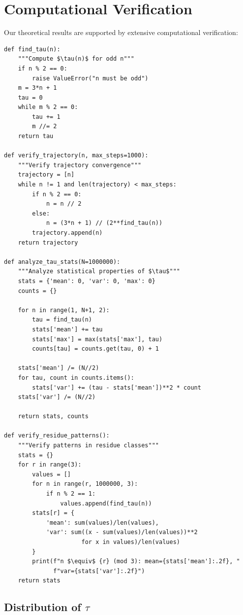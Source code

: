 \section{Computational Verification}\label{sec:computational}

Our theoretical results are supported by extensive computational verification:

\begin{lstlisting}[caption=Core Verification Functions]
def find_tau(n):
    """Compute $\tau(n)$ for odd n"""
    if n % 2 == 0:
        raise ValueError("n must be odd")
    m = 3*n + 1
    tau = 0
    while m % 2 == 0:
        tau += 1
        m //= 2
    return tau

def verify_trajectory(n, max_steps=1000):
    """Verify trajectory convergence"""
    trajectory = [n]
    while n != 1 and len(trajectory) < max_steps:
        if n % 2 == 0:
            n = n // 2
        else:
            n = (3*n + 1) // (2**find_tau(n))
        trajectory.append(n)
    return trajectory

def analyze_tau_stats(N=1000000):
    """Analyze statistical properties of $\tau$"""
    stats = {'mean': 0, 'var': 0, 'max': 0}
    counts = {}
    
    for n in range(1, N+1, 2):
        tau = find_tau(n)
        stats['mean'] += tau
        stats['max'] = max(stats['max'], tau)
        counts[tau] = counts.get(tau, 0) + 1
    
    stats['mean'] /= (N//2)
    for tau, count in counts.items():
        stats['var'] += (tau - stats['mean'])**2 * count
    stats['var'] /= (N//2)
    
    return stats, counts

def verify_residue_patterns():
    """Verify patterns in residue classes"""
    stats = {}
    for r in range(3):
        values = []
        for n in range(r, 1000000, 3):
            if n % 2 == 1:
                values.append(find_tau(n))
        stats[r] = {
            'mean': sum(values)/len(values),
            'var': sum((x - sum(values)/len(values))**2 
                      for x in values)/len(values)
        }
        print(f"n $\equiv$ {r} (mod 3): mean={stats['mean']:.2f}, "
              f"var={stats['var']:.2f}")
    return stats
\end{lstlisting}

\subsection{Distribution of $\tau$}

